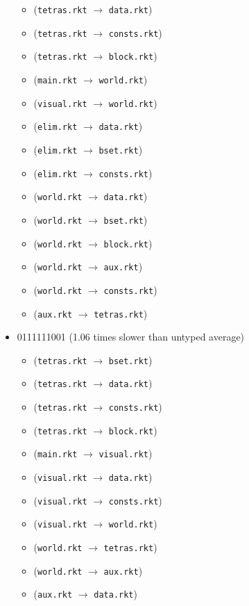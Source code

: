 \documentclass{article}
\newcommand{\mono}[1]{\texttt{#1}}
\begin{document}
\begin{itemize}
\begin{itemize}
  \item (\mono{tetras.rkt} $\rightarrow$ \mono{data.rkt})
  \item (\mono{tetras.rkt} $\rightarrow$ \mono{consts.rkt})
  \item (\mono{tetras.rkt} $\rightarrow$ \mono{block.rkt})
  \item (\mono{main.rkt} $\rightarrow$ \mono{world.rkt})
  \item (\mono{visual.rkt} $\rightarrow$ \mono{world.rkt})
  \item (\mono{elim.rkt} $\rightarrow$ \mono{data.rkt})
  \item (\mono{elim.rkt} $\rightarrow$ \mono{bset.rkt})
  \item (\mono{elim.rkt} $\rightarrow$ \mono{consts.rkt})
  \item (\mono{world.rkt} $\rightarrow$ \mono{data.rkt})
  \item (\mono{world.rkt} $\rightarrow$ \mono{bset.rkt})
  \item (\mono{world.rkt} $\rightarrow$ \mono{block.rkt})
  \item (\mono{world.rkt} $\rightarrow$ \mono{aux.rkt})
  \item (\mono{world.rkt} $\rightarrow$ \mono{consts.rkt})
  \item (\mono{aux.rkt} $\rightarrow$ \mono{tetras.rkt})
  \end{itemize}
\item 0111111001 (1.06 times slower than untyped average)
  \begin{itemize}
  \item (\mono{tetras.rkt} $\rightarrow$ \mono{bset.rkt})
  \item (\mono{tetras.rkt} $\rightarrow$ \mono{data.rkt})
  \item (\mono{tetras.rkt} $\rightarrow$ \mono{consts.rkt})
  \item (\mono{tetras.rkt} $\rightarrow$ \mono{block.rkt})
  \item (\mono{main.rkt} $\rightarrow$ \mono{visual.rkt})
  \item (\mono{visual.rkt} $\rightarrow$ \mono{data.rkt})
  \item (\mono{visual.rkt} $\rightarrow$ \mono{consts.rkt})
  \item (\mono{visual.rkt} $\rightarrow$ \mono{world.rkt})
  \item (\mono{world.rkt} $\rightarrow$ \mono{tetras.rkt})
  \item (\mono{world.rkt} $\rightarrow$ \mono{aux.rkt})
  \item (\mono{aux.rkt} $\rightarrow$ \mono{data.rkt})

\end{itemize}
\end{itemize}
\end{document}
